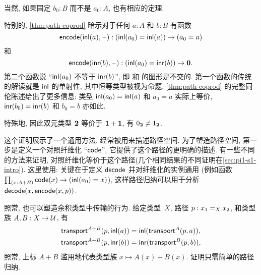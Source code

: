 \noindent
当然, 如果固定 $b_0:B$ 而不是 $a_0:A$, 也有相应的定理.

特别的, \cref{thm:path-coprod} 暗示对于任何 $a : A$ 和 $b : B$ 有函数
%
\[ \encode(\inl(a), {\blank}) : (\inl(a_0)=\inl(a)) \to (a_0=a)\]
%
和
%
\[ \encode(\inr(b), {\blank}) : (\inl(a_0)=\inr(b)) \to \emptyt. \]
%
第二个函数说 ``$\inl(a_0)$ 不等于 $\inr(b)$'', 即 \inl 和 \inr 的图形是不交的.
第一个函数的传统的解读就是 $\inl$ 的单射性, 其中恒等类型被视为命题.
\cref{thm:path-coprod} 的完整同伦陈述给出了更多信息: 类型 $\inl(a_0)=\inl(a)$ 和 $a_0=a$ 实际上等价, $\inr(b_0)=\inr(b)$ 和 $b_0=b$ 亦如此.

\begin{rmk}\label{rmk:true-neq-false}
特殊地, 因此双元类型 $\bool$ 等价于 $\unit+\unit$, 有 $\bfalse\neq\btrue$.
\end{rmk}

这个证明展示了一个通用方法, 经常被用来描述路径空间.
为了塑造路径空间, 第一步是定义一个对照纤维化 ``$\code$'', 它提供了这个路径的更明确的描述.
有一些不同的方法来证明, 对照纤维化等价于这个路径(几个相同结果的不同证明在\cref{sec:pi1-s1-intro}).
这里使用:
关键在于定义 $\decode$ 并对纤维化的实例通用 (例如函数 $\prd{x:A+B} \code(x) \to (\inl(a_0)=x)$), 这样路径归纳可以用于分析 $\decode(x,\encode(x,p))$.

%
照常, 也可以塑造余积类型中传输的行为.
给定类型~$X$, 路径 $p:\id[X]{x_1}{x_2}$, 和类型族 $A,B:X\to\type$, 有
\begin{align*}
  \transfib{A+B}{p}{\inl(a)} &= \inl (\transfib{A}{p}{a}),\\
  \transfib{A+B}{p}{\inr(b)} &= \inr (\transfib{B}{p}{b}),
\end{align*}
照常, 上标 $A+B$ 滥用地代表类型族 $x\mapsto A(x)+B(x)$.
证明只需简单的路径归纳.

%
%